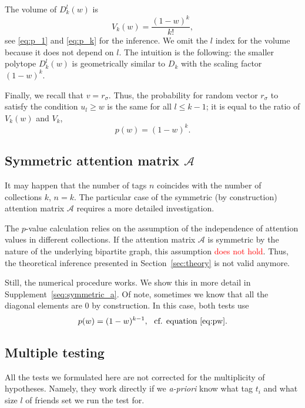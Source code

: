 \documentclass{llncs}
\begin{document}
The volume of $D^{l}_{k}(w)$ is 
\begin{equation}
V_{k}(w) = \frac{(1-w)^k}{k!},
\end{equation}
see \eqref{eq:p_1} and \eqref{eq:p_k} for the inference. We omit the $l$ index for the volume because it does not depend on $l$. The intuition is the following: the smaller polytope $D^{l}_{k}(w)$ is geometrically similar to $D_{k}$ with the scaling factor $(1-w)^k$. 

Finally, we recall that $v = r_{\sigma}$. Thus, the probability for random vector $r_{\sigma}$ to satisfy the condition $u_{l} \ge w$ is the same for all $l\leq k-1$; it is equal to the ratio of $V_{k}(w)$ and $V_k$,
\begin{equation}
\label{eq:pw}
    p(w) = (1-w)^k.
\end{equation}


\subsection{Symmetric attention matrix $\mathcal{A}$}
It may happen that the number of tags $n$ coincides with the number of collections $k$, $n = k$. The particular case of the symmetric (by construction) attention matrix $\mathcal{A}$ requires a more detailed investigation.

The $p$-value calculation relies on the assumption of the independence of attention values in different collections. If the attention matrix $\mathcal{A}$ is symmetric by the nature of the underlying bipartite graph, this assumption \textcolor{red}{does not hold}. Thus, the theoretical inference presented in Section~\ref{sec:theory} is not valid anymore.

Still, the numerical procedure works. We show this in more detail in Supplement~\ref{seq:symmetric_a}. Of note, sometimes we know that all the diagonal elements are $0$ by construction. In this case, both tests use 
\[
p(w) = (1-w)^{k-1}, ~~\text{cf. equation \eqref{eq:pw}.}
\]

\subsection{Multiple testing}
\label{sec:multimurkers}

All the tests we formulated here are not corrected for the multiplicity of hypotheses. Namely, they work directly if we \textit{a-priori} know what tag $t_i$ and what size $l$ of friends set we run the test for. 
\end{document}
